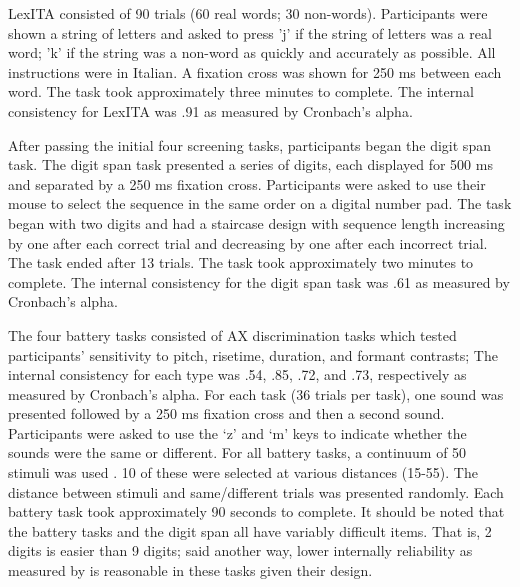 LexITA  consisted of 90 trials (60 real words; 30 non-words). Participants were shown a string of letters and asked to press 'j' if the string of letters was a real word; 'k' if the string was a non-word as quickly and accurately as possible. All instructions were in Italian. A fixation cross was shown for 250 ms between each word. The task took approximately three minutes to complete. The internal consistency for LexITA was .91 as measured by Cronbach's alpha.

After passing the initial four screening tasks, participants began the digit span task. The digit span task presented a series of digits, each displayed for 500 ms and separated by a 250 ms fixation cross. Participants were asked to use their mouse to select the sequence in the same order on a digital number pad. The task began with two digits and had a staircase design with sequence length increasing by one after each correct trial and decreasing by one after each incorrect trial. The task ended after 13 trials. The task took approximately two minutes to complete. The internal consistency for the digit span task was .61 as measured by Cronbach's alpha.

The four battery tasks consisted of AX discrimination tasks which tested participants' sensitivity to pitch, risetime, duration, and formant contrasts; The internal consistency for each type was .54, .85, .72, and .73, respectively as measured by Cronbach's alpha. For each task (36 trials per task), one sound was presented followed by a 250 ms fixation cross and then a second sound. Participants were asked to use the `z' and `m' keys to indicate whether the sounds were the same or different. For all battery tasks, a continuum of 50 stimuli was used . 10 of these were selected at various distances (15-55). The distance between stimuli and same/different trials was presented randomly. Each battery task took approximately 90 seconds to complete. It should be noted that the battery tasks and the digit span all have variably difficult items. That is, 2 digits is easier than 9 digits; said another way, lower internally reliability as measured by is reasonable in these tasks given their design. 

